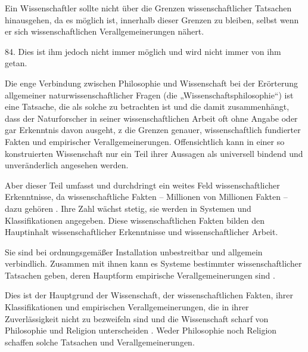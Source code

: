 \documentclass[11pt,a4paper]{book}
\begin{document}
Ein Wissenschaftler sollte nicht über die Grenzen wissenschaftlicher Tatsachen hinausgehen, da es möglich ist, innerhalb dieser Grenzen zu bleiben, selbst wenn er sich wissenschaftlichen Verallgemeinerungen nähert.



84. Dies ist ihm jedoch nicht immer möglich und wird nicht immer von ihm getan.



Die enge Verbindung zwischen Philosophie und Wissenschaft bei der Erörterung allgemeiner naturwissenschaftlicher Fragen (die „Wissenschaftsphilosophie“) ist eine Tatsache, die als solche zu betrachten ist und die damit zusammenhängt, dass der Naturforscher in seiner wissenschaftlichen Arbeit oft ohne Angabe oder gar Erkenntnis davon ausgeht, z die Grenzen genauer, wissenschaftlich fundierter Fakten und empirischer Verallgemeinerungen. Offensichtlich kann in einer so konstruierten Wissenschaft nur ein Teil ihrer Aussagen als universell bindend und unveränderlich angesehen werden.



Aber dieser Teil umfasst und durchdringt ein weites Feld wissenschaftlicher Erkenntnisse, da wissenschaftliche Fakten -- Millionen von Millionen Fakten -- dazu gehören . Ihre Zahl wächst stetig, sie werden in Systemen und Klassifikationen angegeben. Diese wissenschaftlichen Fakten bilden den Hauptinhalt wissenschaftlicher Erkenntnisse und wissenschaftlicher Arbeit.



Sie sind bei ordnungsgemäßer Installation unbestreitbar und allgemein verbindlich. Zusammen mit ihnen kann es Systeme bestimmter wissenschaftlicher Tatsachen geben, deren Hauptform empirische Verallgemeinerungen sind .



Dies ist der Hauptgrund der Wissenschaft, der wissenschaftlichen Fakten, ihrer Klassifikationen und empirischen Verallgemeinerungen, die in ihrer Zuverlässigkeit nicht zu bezweifeln sind und die Wissenschaft scharf von Philosophie und Religion unterscheiden . Weder Philosophie noch Religion schaffen solche Tatsachen und Verallgemeinerungen.
\end{document}
